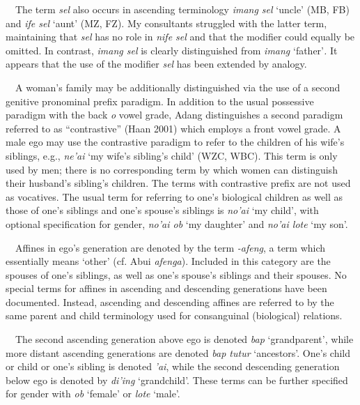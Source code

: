 \ \ The term \textit{sel }also occurs in ascending terminology \textit{imang sel }{\textquoteleft}uncle{\textquoteright} (MB, FB) and \textit{ife sel} {\textquoteleft}aunt{\textquoteright} (MZ, FZ). My consultants struggled with the latter term, maintaining that \textit{sel }has no role in \textit{nife sel} and that the modifier could equally be omitted. In contrast, \textit{imang sel} is clearly distinguished from \textit{imang }{\textquoteleft}father{\textquoteright}\textit{.} It appears that the use of the modifier \textit{sel }has been extended by analogy.

\ \ A woman{\textquoteright}s family may be additionally distinguished via the use of a second genitive pronominal prefix paradigm. In addition to the usual possessive paradigm with the back \textit{o} vowel grade, Adang distinguishes a second paradigm referred to as {\textquotedblleft}contrastive{\textquotedblright} (Haan 2001) which employs a front vowel grade. A male ego may use the contrastive paradigm to refer to the children of his wife{\textquoteright}s siblings, e.g., \textit{ne{\textquoteright}ai }{\textquoteleft}my wife{\textquoteright}s sibling{\textquoteright}s child{\textquoteright} (WZC, WBC). This term is only used by men; there is no corresponding term by which women can distinguish their husband{\textquoteright}s sibling{\textquoteright}s children. The terms with contrastive prefix are not used as vocatives. The usual term for referring to one{\textquoteright}s biological children as well as those of one{\textquoteright}s siblings and one{\textquoteright}s spouse{\textquoteright}s siblings 
is \textit{no{\textquoteright}ai} {\textquoteleft}my child{\textquoteright}, with optional specification for gender, \textit{no{\textquoteright}ai ob }{\textquoteleft}my daughter{\textquoteright} and \textit{no{\textquoteright}ai lote }{\textquoteleft}my son{\textquoteright}.

\ \ Affines in ego{\textquoteright}s generation are denoted by the term \textit{{}-afeng}, a term which essentially means {\textquoteleft}other{\textquoteright} (cf. Abui \textit{afenga}). Included in this category are the spouses of one{\textquoteright}s siblings, as well as one{\textquoteright}s spouse{\textquoteright}s siblings and their spouses. No special terms for affines in ascending and descending generations have been documented. Instead, ascending and descending affines are referred to by the same parent and child terminology used for consanguinal (biological) relations. 

\ \ The second ascending generation above ego is denoted \textit{bap} {\textquoteleft}grandparent{\textquoteright}, while more distant ascending generations are denoted \textit{bap tutur }{\textquoteleft}ancestors{\textquoteright}. One{\textquoteright}s child or child or one{\textquoteright}s sibling is denoted \textit{{\textquoteright}ai}, while the second descending generation below ego is denoted by \textit{di{\textquoteright}ing} {\textquoteleft}grandchild{\textquoteright}. These terms can be further specified for gender with \textit{ob }{\textquoteleft}female{\textquoteright} or \textit{lote }{\textquoteleft}male{\textquoteright}. 

